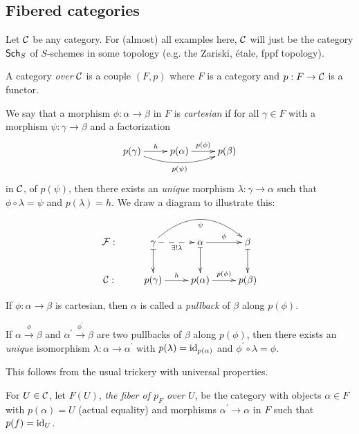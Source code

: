 \documentclass[11pt, english]{article}
\begin{document}
\subsection{Fibered categories}  

Let $\mathcal{C}$ be any category. For (almost) all examples here, $\mathcal{C}$ will just be the category $\mathsf{Sch}_{S}$ of $S$-schemes in some topology (e.g. the Zariski, étale, fppf topology). 

\begin{defi}
A category \emph{over} $\mathcal{C}$ is a couple $(F,p)$ where $F$ is a category and $p:F \to \mathcal{C}$ is a functor.
\end{defi}

We say that a morphism $\phi:\alpha \to \beta$ in $F$ is \emph{cartesian} if for all $\gamma \in F$ with a morphism $\psi: \gamma \to \beta$ and a factorization
\[
\xymatrix{
p(\gamma)\ar@/_1pc/[rr]_{p(\psi)}  \ar[r]^h & p(\alpha) \ar[r]^{p(\phi)} & p(\beta) 
}
\]
in $\mathcal{C}$, of $p(\psi)$, then there exists an \emph{unique} morphism $\lambda:\gamma \to \alpha$ such that $\phi \circ \lambda = \psi$ and $p(\lambda)=h$. We draw a diagram to illustrate this:

\[
\xymatrix{
\mathcal F: & \gamma \ar@/^2pc/[rr]_\psi \ar@{-->}[r]_{\exists ! \lambda} \ar@{|->}[d] & \alpha \ar@{|->}[d] \ar[r]^\phi & \beta \ar@{|->}[d] \\
\CC: & p(\gamma) \ar[r] ^h & p(\alpha) \ar[r]^{p(\phi)} & p(\beta)
}
\]

If $\phi:\alpha \to \beta$ is cartesian, then $\alpha$ is called a \emph{pullback} of $\beta$ along $p(\phi)$.

\begin{exc}
\label{ex:unique}
If $\alpha \xrightarrow{\phi} \beta$ and $\alpha^\prime \xrightarrow{\phi^\prime} \beta$ are two pullbacks of $\beta$ along $p(\phi)$, then there exists an \emph{unique} isomorphism $\lambda:\alpha \to \alpha^\prime$ with $p(\lambda)=\text{id}_{p(\alpha)}$ and $\phi^\prime \circ \lambda = \phi$. 
\end{exc}
\begin{sol}
This follows from the usual trickery with universal properties.
\end{sol}


\begin{defi}
For $U \in \mathcal{C}$, let $F(U)$, \emph{the fiber of $p_F$ over $U$}, be the category with objects $\alpha \in F$ with $p(\alpha)=U$ (actual equality) and morphisms $\alpha^\prime \to \alpha$ in $F$ such that $p(f)=\text{id}_U$.
\end{defi}
\end{document}
